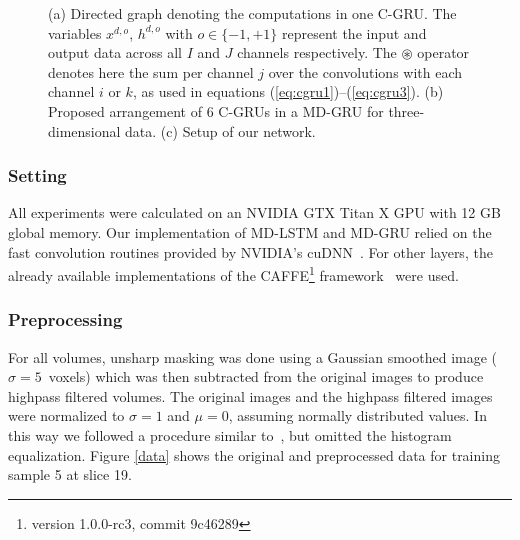 \documentclass[runningheads,a4paper]{llncs}
\begin{document}
\begin{figure}
 \centering
 \qquad
 \quad
 
 \caption{(a) Directed graph denoting the computations in one C-GRU. The variables $x^{d,o}$, $h^{d,o}$ with $o \in \{-1,+1\}$ represent the input and output data across all $I$ and $J$ channels respectively. The $\circledast$ operator denotes here the sum per channel $j$ over the convolutions with each channel $i$ or $k$, as used in equations (\ref{eq:cgru1})--(\ref{eq:cgru3}). (b) Proposed arrangement of 6 C-GRUs in a MD-GRU for three-dimensional data. (c) Setup of our network.} \label{fig:network}
\end{figure}


\subsubsection{Setting}\label{setting}
All experiments were calculated on an NVIDIA GTX Titan X GPU with 12 GB global memory. Our implementation of MD-LSTM and MD-GRU relied on the fast convolution routines provided by NVIDIA's cuDNN~\cite{chetlur_cudnn:_2014}. For other layers, the already available implementations of the CAFFE\footnote{version 1.0.0-rc3, commit 9c46289} framework~\cite{jia2014caffe} were used.

\subsubsection{Preprocessing}
For all volumes, unsharp masking was done using a Gaussian smoothed image ($\sigma=5$~voxels) which was then subtracted from the original images to produce highpass filtered volumes. The original images and the highpass filtered images were normalized to $\sigma=1$ and $\mu=0$, assuming normally distributed values. In this way we followed a procedure similar to~\cite{stollenga_parallel_2015}, but omitted the histogram equalization. Figure \ref{data} shows the original and preprocessed data for training sample 5 at slice 19.
\end{document}
